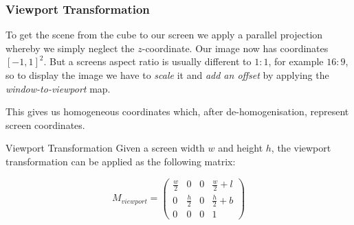 \documentclass{panikzettel}
\begin{document}
\begin{center}
\end{center}

\subsubsection*{Viewport Transformation}

\begin{halfboxl}
To get the scene from the cube to our screen we apply a parallel projection whereby we simply neglect the $z$-coordinate. Our image now has coordinates $[-1, 1]^2$. But a screens aspect ratio is usually different to $1:1$, for example $16:9$, so to display the image we have to \emph{scale} it and \emph{add an offset} by applying the \emph{window-to-viewport} map.

This gives us homogeneous coordinates which, after de-homogenisation, represent screen coordinates.
\end{halfboxl}%
\begin{halfboxr}
\vspace{-\baselineskip}
\begin{defi}{Viewport Transformation}
Given a screen width $w$ and height $h$, the viewport transformation can be applied as the following matrix:

$$M_{viewport} = \begin{pmatrix}
\frac{w}{2} & 0 & 0 & \frac{w}{2} + l \\
0 & \frac{h}{2} & 0 & \frac{h}{2} + b \\
0 & 0 & 0 & 1
\end{pmatrix}$$
\end{defi}
\end{halfboxr}
\end{document}
